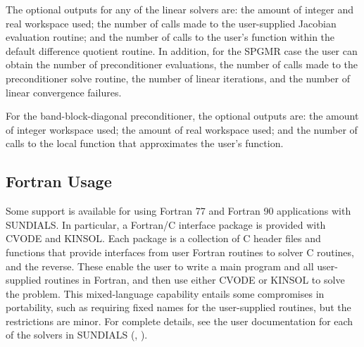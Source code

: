 The optional outputs for any of the linear solvers are: the amount of 
integer and real workspace used; the number of calls made to the user-supplied 
Jacobian evaluation routine; and the number of calls to the user's function 
within the default difference quotient routine.
In addition, for the SPGMR case the user can 
obtain the number of preconditioner
evaluations, the number of calls made to the preconditioner solve
routine, the number of linear iterations, and the number of linear
convergence failures.

For the band-block-diagonal preconditioner, the optional outputs are:
the amount of integer workspace used; the amount of real workspace
used; and the number of calls to the local function that approximates
the user's function.

\subsection{Fortran Usage} 
\label{ss:Fortran_usage}

Some support is available for using Fortran 77 and Fortran 90
applications with
SUNDIALS.  In particular, a Fortran/C interface package is provided
with CVODE and KINSOL.  Each package is a collection of C header files
and functions that provide interfaces from user Fortran routines to
solver C routines, and the reverse.  These enable the user to write a
main program and all user-supplied routines in Fortran, and then use
either CVODE or KINSOL to solve the problem.  This mixed-language
capability entails some compromises in portability, such as requiring
fixed names for the user-supplied routines, but the restrictions are
minor.  For complete details, see the user documentation for each of
the solvers in SUNDIALS (\cite{HiSe:04cvode}, \cite{HSW:04kinsol}).
